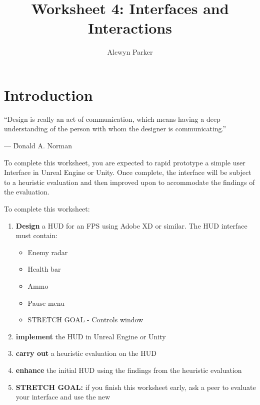 \documentclass{../../../fal_assignment}
\title{Worksheet 4: Interfaces and Interactions}
\author{Alcwyn Parker	}
\begin{document}
\maketitle

\section*{Introduction}

\begin{marginquote}
``Design is really an act of communication, which means having a deep understanding of the person with whom the designer is communicating.''
\par --- \'Donald A. Norman
\end{marginquote}

To complete this worksheet, you are expected to rapid prototype a simple user Interface in Unreal Engine or Unity. Once complete, the interface will be subject to a heuristic evaluation and then improved upon to accommodate the findings of the evaluation. 

To complete this worksheet: 

\begin{enumerate}[label=(\roman*)]
    \item \textbf{Design} a HUD for an FPS using Adobe XD or similar. The HUD interface must contain:
    \begin{itemize}
    	\item Enemy radar 
	\item Health bar
	\item Ammo
	\item Pause menu
	\item STRETCH GOAL - Controls window
    \end{itemize}
    \item \textbf{implement} the HUD in Unreal Engine or Unity
    \item \textbf{carry out} a heuristic evaluation on the HUD 
    \item \textbf{enhance} the initial HUD using the findings from the heuristic evaluation
    \item \textbf{STRETCH GOAL: } if you finish this worksheet early, ask a peer to evaluate your interface and use the new 
\end{enumerate}
\end{document}
